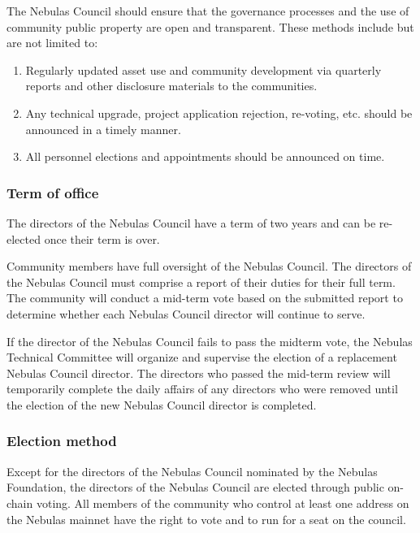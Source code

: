 The Nebulas Council should ensure that the governance processes and the use of community public property are open and transparent. These methods include but are not limited to:

\begin{enumerate}
	\item Regularly updated asset use and community development via quarterly reports and other disclosure materials to the communities.
	\item Any technical upgrade, project application rejection, re-voting, etc. should be announced in a timely manner.
	\item All personnel elections and appointments should be announced on time.
\end{enumerate}

\subsubsection{Term of office}

The directors of the Nebulas Council have a term of two years and can be re-elected once their term is over.

\vspace{2em}


Community members have full oversight of the Nebulas Council. The directors of the Nebulas Council must comprise a report of their duties for their full term. The community will conduct a mid-term vote based on the submitted report to determine whether each Nebulas Council director will continue to serve.

If the director of the Nebulas Council fails to pass the midterm vote, the Nebulas Technical Committee will organize and supervise the election of a replacement Nebulas Council director. The directors who passed the mid-term review will temporarily complete the daily affairs of any directors who were removed until the election of the new Nebulas Council director is completed.

\subsubsection{Election method}

Except for the directors of the Nebulas Council nominated by the Nebulas Foundation, the directors of the Nebulas Council are elected through public on-chain voting. All members of the community who control at least one address on the Nebulas mainnet have the right to vote and to run for a seat on the council.

